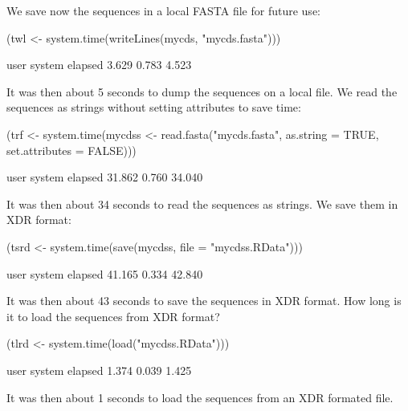 \documentclass{article}
\begin{document}
We save now the sequences in a local FASTA file for future use:

\begin{Schunk}
\begin{Sinput}
 (twl <- system.time(writeLines(mycds, "mycds.fasta")))
\end{Sinput}
\begin{Soutput}
   user  system elapsed 
  3.629   0.783   4.523 
\end{Soutput}
\end{Schunk}

It was then about 5 seconds
to dump the sequences on a local file. We read the sequences as strings
without setting attributes to save time:

\begin{Schunk}
\begin{Sinput}
 (trf <- system.time(mycdss <- read.fasta("mycds.fasta", as.string = TRUE, 
     set.attributes = FALSE)))
\end{Sinput}
\begin{Soutput}
   user  system elapsed 
 31.862   0.760  34.040 
\end{Soutput}
\end{Schunk}

It was then about 34 seconds
to read the sequences as strings. We save them in XDR format:

\begin{Schunk}
\begin{Sinput}
 (tsrd <- system.time(save(mycdss, file = "mycdss.RData")))
\end{Sinput}
\begin{Soutput}
   user  system elapsed 
 41.165   0.334  42.840 
\end{Soutput}
\end{Schunk}

It was then about 43 seconds
to save the sequences in XDR format. How long is it to load the sequences
from XDR format?

\begin{Schunk}
\begin{Sinput}
 (tlrd <- system.time(load("mycdss.RData")))
\end{Sinput}
\begin{Soutput}
   user  system elapsed 
  1.374   0.039   1.425 
\end{Soutput}
\end{Schunk}

It was then about 1 seconds
to load the sequences from an XDR formated file. 
\end{document}
